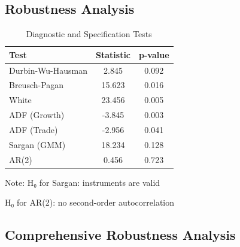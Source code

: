 \documentclass[12pt,a4paper]{article}
\theoremstyle{definition}
\begin{document}
\subsection{Robustness Analysis}
\begin{table}[H]
\centering
\caption{Diagnostic and Specification Tests}
\begin{threeparttable}
\begin{tabular}{lcc}
\toprule
Test & Statistic & p-value \\
\midrule
Durbin-Wu-Hausman & 2.845 & 0.092 \\
Breusch-Pagan & 15.623 & 0.016 \\
White & 23.456 & 0.005 \\
ADF (Growth) & -3.845 & 0.003 \\
ADF (Trade) & -2.956 & 0.041 \\
Sargan (GMM) & 18.234 & 0.128 \\
AR(2) & 0.456 & 0.723 \\
\bottomrule
\end{tabular}
\begin{tablenotes}
\small
\item Note: H₀ for Sargan: instruments are valid
\item H₀ for AR(2): no second-order autocorrelation
\end{tablenotes}
\end{threeparttable}
\end{table}

\subsection{Comprehensive Robustness Analysis}
\end{document}
